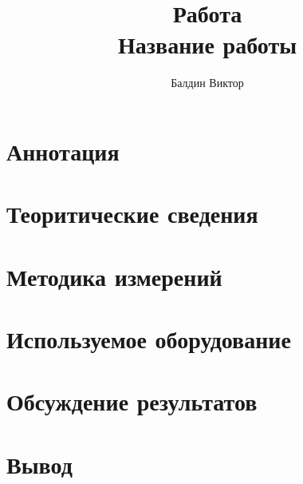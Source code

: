 \documentclass[a4paper, 12pt]{article}
\author{Балдин Виктор}
\title{Работа \\ Название работы}
\begin{document}
	\maketitle
	\section{Аннотация}

	\section{Теоритические сведения}
 	\section{Методика измерений}


	\section{Используемое оборудование}

	\section{Обсуждение результатов}
	\section{Вывод}
\end{document}

